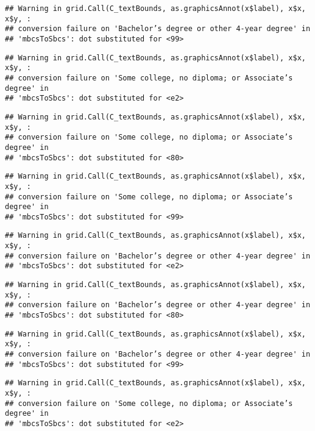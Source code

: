 \documentclass[
]{article}
\begin{document}
\begin{verbatim}
## Warning in grid.Call(C_textBounds, as.graphicsAnnot(x$label), x$x, x$y, :
## conversion failure on 'Bachelor’s degree or other 4-year degree' in
## 'mbcsToSbcs': dot substituted for <99>
\end{verbatim}

\begin{verbatim}
## Warning in grid.Call(C_textBounds, as.graphicsAnnot(x$label), x$x, x$y, :
## conversion failure on 'Some college, no diploma; or Associate’s degree' in
## 'mbcsToSbcs': dot substituted for <e2>
\end{verbatim}

\begin{verbatim}
## Warning in grid.Call(C_textBounds, as.graphicsAnnot(x$label), x$x, x$y, :
## conversion failure on 'Some college, no diploma; or Associate’s degree' in
## 'mbcsToSbcs': dot substituted for <80>
\end{verbatim}

\begin{verbatim}
## Warning in grid.Call(C_textBounds, as.graphicsAnnot(x$label), x$x, x$y, :
## conversion failure on 'Some college, no diploma; or Associate’s degree' in
## 'mbcsToSbcs': dot substituted for <99>
\end{verbatim}

\begin{verbatim}
## Warning in grid.Call(C_textBounds, as.graphicsAnnot(x$label), x$x, x$y, :
## conversion failure on 'Bachelor’s degree or other 4-year degree' in
## 'mbcsToSbcs': dot substituted for <e2>
\end{verbatim}

\begin{verbatim}
## Warning in grid.Call(C_textBounds, as.graphicsAnnot(x$label), x$x, x$y, :
## conversion failure on 'Bachelor’s degree or other 4-year degree' in
## 'mbcsToSbcs': dot substituted for <80>
\end{verbatim}

\begin{verbatim}
## Warning in grid.Call(C_textBounds, as.graphicsAnnot(x$label), x$x, x$y, :
## conversion failure on 'Bachelor’s degree or other 4-year degree' in
## 'mbcsToSbcs': dot substituted for <99>
\end{verbatim}

\begin{verbatim}
## Warning in grid.Call(C_textBounds, as.graphicsAnnot(x$label), x$x, x$y, :
## conversion failure on 'Some college, no diploma; or Associate’s degree' in
## 'mbcsToSbcs': dot substituted for <e2>
\end{verbatim}
\end{document}
